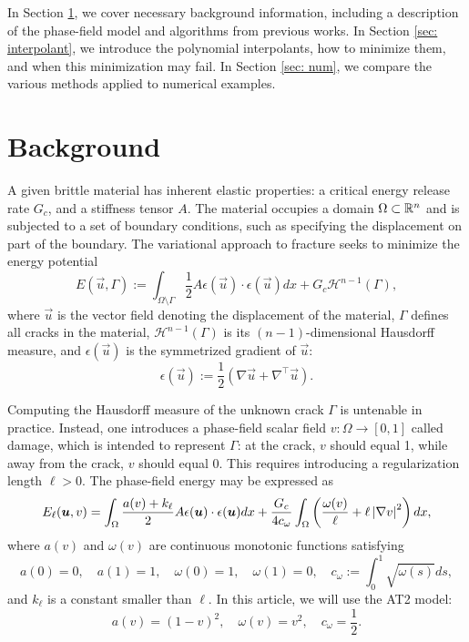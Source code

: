 \documentclass{article}
\numberwithin{equation}{section}
\begin{document}
In Section \ref{sec: bg}, we cover necessary background information, including a description of the phase-field model and algorithms from previous works.
In Section \ref{sec: interpolant}, we introduce the polynomial interpolants, how to minimize them, and when this minimization may fail.
In Section \ref{sec: num}, we compare the various methods applied to numerical examples.

\section{Background}
\label{sec: bg}

A given brittle material has inherent elastic properties: a critical energy release rate $G_c$, and a stiffness tensor $A$.
The material occupies a domain $\Omega \subset \mathbb{R}^n$ and is subjected to a set of boundary conditions, such as specifying the displacement on part of the boundary.
The variational approach to fracture seeks to minimize the energy potential
\begin{equation} \label{eq: var}
	E(\vec{u}, \Gamma) := \int_{\Omega \setminus \Gamma} \frac{1}{2} A \epsilon(\vec{u}) \cdot \epsilon(\vec{u}) dx + G_c \mathcal{H}^{n-1}(\Gamma),
\end{equation}
where $\vec{u}$ is the vector field denoting the displacement of the material,
$\Gamma$ defines all cracks in the material, $\mathcal{H}^{n-1}(\Gamma)$ is its $(n-1)$-dimensional Hausdorff measure, and $\epsilon(\vec{u})$ is the symmetrized gradient of $\vec{u}$:
\begin{equation*}
	\epsilon(\vec{u}) := \frac{1}{2} \left ( \nabla \vec{u} + \nabla^\top \vec{u} \right ).
\end{equation*}

Computing the Hausdorff measure of the unknown crack $\Gamma$ is untenable in practice.
Instead, one introduces a phase-field scalar field $v : \Omega \to [0,1]$ called damage, which is intended to represent $\Gamma$:
at the crack, $v$ should equal 1, while away from the crack, $v$ should equal 0.
This requires introducing a regularization length $\ell>0$.
The phase-field energy may be expressed as
\begin{equation} \label{eq: energy}
	E_\ell(\bm{u}, v) = \int_{\Omega} \frac{a(v) + k_\ell}{2} A \epsilon(\bm{u}) \cdot \epsilon(\bm{u}) dx + \frac{G_c}{4 c_\omega} \int_{\Omega} \left ( \frac{\omega(v)}{\ell} + \ell \left \vert \nabla v \right \vert^2 \right ) dx,
\end{equation}
where $a(v)$ and $\omega(v)$ are continuous monotonic functions satisfying
\begin{equation*}
	a(0)=0, \quad a(1)=1, \quad \omega(0)=1, \quad \omega(1)=0, \quad c_\omega := \int_0^1 \sqrt{\omega(s)} ds,
\end{equation*}
and $k_\ell$ is a constant smaller than $\ell$.
In this article, we will use the AT2 model:
\begin{equation} \label{eq: AT2}
	a(v) = (1-v)^2, \quad \omega(v) = v^2, \quad c_\omega = \frac{1}{2}.
\end{equation}
\end{document}
